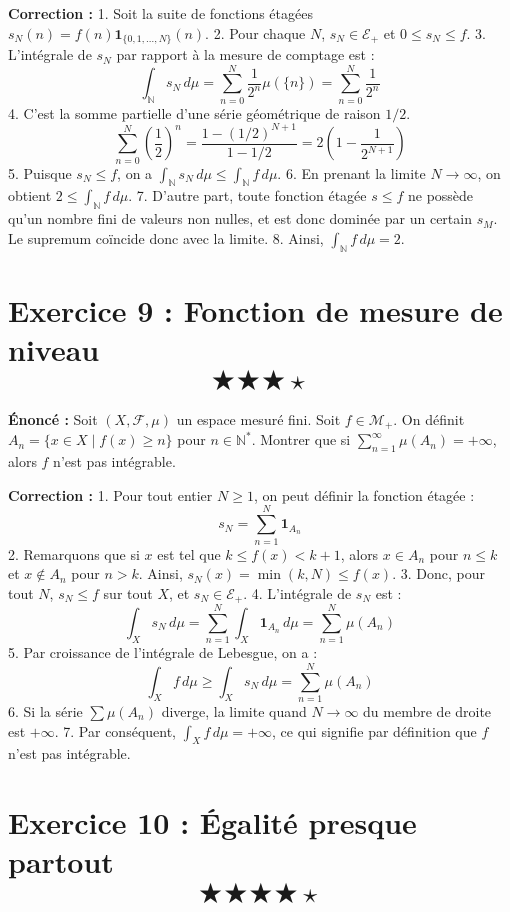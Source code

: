 \documentclass[11pt,a4paper]{article}
\begin{document}
\textbf{Correction :}
1. Soit la suite de fonctions étagées $s_N(n) = f(n) \mathbf{1}_{\{0, 1, \dots, N\}}(n)$.
2. Pour chaque $N$, $s_N \in \mathcal{E}_+$ et $0 \le s_N \le f$.
3. L'intégrale de $s_N$ par rapport à la mesure de comptage est :
   $$\int_{\mathbb{N}} s_N \, d\mu = \sum_{n=0}^N \frac{1}{2^n} \mu(\{n\}) = \sum_{n=0}^N \frac{1}{2^n}$$
4. C'est la somme partielle d'une série géométrique de raison $1/2$.
   $$\sum_{n=0}^N \left(\frac{1}{2}\right)^n = \frac{1 - (1/2)^{N+1}}{1 - 1/2} = 2 \left(1 - \frac{1}{2^{N+1}}\right)$$
5. Puisque $s_N \le f$, on a $\int_{\mathbb{N}} s_N \, d\mu \le \int_{\mathbb{N}} f \, d\mu$.
6. En prenant la limite $N \to \infty$, on obtient $2 \le \int_{\mathbb{N}} f \, d\mu$.
7. D'autre part, toute fonction étagée $s \le f$ ne possède qu'un nombre fini de valeurs non nulles, et est donc dominée par un certain $s_M$. Le supremum coïncide donc avec la limite.
8. Ainsi, $\int_{\mathbb{N}} f \, d\mu = 2$.


\section{Exercice 9 : Fonction de mesure de niveau \quad $$\bigstar\bigstar\bigstar\star$$}

\textbf{Énoncé :}
Soit $(X, \mathcal{F}, \mu)$ un espace mesuré fini. Soit $f \in \mathcal{M}_+$.
On définit $A_n = \{x \in X \mid f(x) \ge n\}$ pour $n \in \mathbb{N}^*$.
Montrer que si $\sum_{n=1}^\infty \mu(A_n) = +\infty$, alors $f$ n'est pas intégrable.

\textbf{Correction :}
1. Pour tout entier $N \ge 1$, on peut définir la fonction étagée :
   $$s_N = \sum_{n=1}^N \mathbf{1}_{A_n}$$
2. Remarquons que si $x$ est tel que $k \le f(x) < k+1$, alors $x \in A_n$ pour $n \le k$ et $x \notin A_n$ pour $n > k$.
   Ainsi, $s_N(x) = \min(k, N) \le f(x)$.
3. Donc, pour tout $N$, $s_N \le f$ sur tout $X$, et $s_N \in \mathcal{E}_+$.
4. L'intégrale de $s_N$ est :
   $$\int_X s_N \, d\mu = \sum_{n=1}^N \int_X \mathbf{1}_{A_n} \, d\mu = \sum_{n=1}^N \mu(A_n)$$
5. Par croissance de l'intégrale de Lebesgue, on a :
   $$\int_X f \, d\mu \ge \int_X s_N \, d\mu = \sum_{n=1}^N \mu(A_n)$$
6. Si la série $\sum \mu(A_n)$ diverge, la limite quand $N \to \infty$ du membre de droite est $+\infty$.
7. Par conséquent, $\int_X f \, d\mu = +\infty$, ce qui signifie par définition que $f$ n'est pas intégrable.


\section{Exercice 10 : Égalité presque partout \quad $$\bigstar\bigstar\bigstar\bigstar\star$$}
\end{document}
